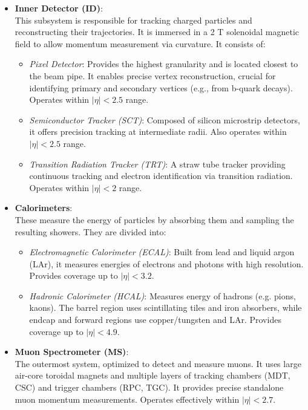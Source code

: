 \begin{itemize}
\item \textbf{Inner Detector (ID)}:
\\This subsystem is responsible for tracking charged particles and reconstructing their trajectories. It is immersed in a 2 T solenoidal magnetic field to allow momentum measurement via curvature. It consists of:
\begin{itemize}
\item \textit{Pixel Detector}: Provides the highest granularity and is located closest to the beam pipe. It enables precise vertex reconstruction, crucial for identifying primary and secondary vertices (e.g., from b-quark decays). Operates within $|\eta|<2.5$ range.
\item \textit{Semiconductor Tracker (SCT)}: Composed of silicon microstrip detectors, it offers precision tracking at intermediate radii. Also operates within $|\eta|<2.5$ range.
\item \textit{Transition Radiation Tracker (TRT)}: A straw tube tracker providing continuous tracking and electron identification via transition radiation. Operates within $|\eta|<2$ range.
\end{itemize}

\item \textbf{Calorimeters}:
\\These measure the energy of particles by absorbing them and sampling the resulting showers. They are divided into:
\begin{itemize}
    \item \textit{Electromagnetic Calorimeter (ECAL)}: Built from lead and liquid argon (LAr), it measures energies of electrons and photons with high resolution. Provides coverage up to $|\eta| < 3.2$.
    \item \textit{Hadronic Calorimeter (HCAL)}: Measures energy of hadrons (e.g. pions, kaons). The barrel region uses scintillating tiles and iron absorbers, while endcap and forward regions use copper/tungsten and LAr. Provides coverage up to $|\eta| < 4.9$.
\end{itemize}

\item \textbf{Muon Spectrometer (MS)}:
\\The outermost system, optimized to detect and measure muons. It uses large air-core toroidal magnets and multiple layers of tracking chambers (MDT, CSC) and trigger chambers (RPC, TGC). It provides precise standalone muon momentum measurements. Operates effectively within $|\eta| < 2.7$.


\end{itemize}
